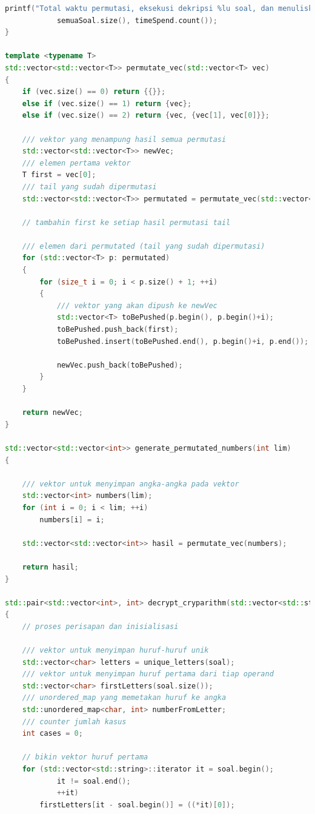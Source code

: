 \documentclass{article}
\begin{document}
\begin{lstlisting}[caption = "main.cpp", language = c++]
    printf("Total waktu permutasi, eksekusi dekripsi %lu soal, dan menuliskan output adalah %lf detik.\n",
            semuaSoal.size(), timeSpend.count());
}

template <typename T>
std::vector<std::vector<T>> permutate_vec(std::vector<T> vec)
{
    if (vec.size() == 0) return {{}};
    else if (vec.size() == 1) return {vec};
    else if (vec.size() == 2) return {vec, {vec[1], vec[0]}};

    /// vektor yang menampung hasil semua permutasi
    std::vector<std::vector<T>> newVec;
    /// elemen pertama vektor
    T first = vec[0];
    /// tail yang sudah dipermutasi
    std::vector<std::vector<T>> permutated = permutate_vec(std::vector<T>(vec.begin()+1, vec.end()));

    // tambahin first ke setiap hasil permutasi tail

    /// elemen dari permutated (tail yang sudah dipermutasi)
    for (std::vector<T> p: permutated)
    {
        for (size_t i = 0; i < p.size() + 1; ++i)
        {
            /// vektor yang akan dipush ke newVec
            std::vector<T> toBePushed(p.begin(), p.begin()+i);
            toBePushed.push_back(first);
            toBePushed.insert(toBePushed.end(), p.begin()+i, p.end());

            newVec.push_back(toBePushed);
        }
    }

    return newVec;
}

std::vector<std::vector<int>> generate_permutated_numbers(int lim)
{

    /// vektor untuk menyimpan angka-angka pada vektor
    std::vector<int> numbers(lim);
    for (int i = 0; i < lim; ++i)
        numbers[i] = i;

    std::vector<std::vector<int>> hasil = permutate_vec(numbers);

    return hasil;
}

std::pair<std::vector<int>, int> decrypt_cryparithm(std::vector<std::string> soal, std::vector<std::vector<int>> permutatedNumbers)
{
    // proses perisapan dan inisialisasi

    /// vektor untuk menyimpan huruf-huruf unik
    std::vector<char> letters = unique_letters(soal);
    /// vektor untuk menyimpan huruf pertama dari tiap operand
    std::vector<char> firstLetters(soal.size());
    /// unordered_map yang memetakan huruf ke angka
    std::unordered_map<char, int> numberFromLetter;
    /// counter jumlah kasus
    int cases = 0;

    // bikin vektor huruf pertama
    for (std::vector<std::string>::iterator it = soal.begin();
            it != soal.end();
            ++it)
        firstLetters[it - soal.begin()] = ((*it)[0]);


\end{lstlisting}
\end{document}
